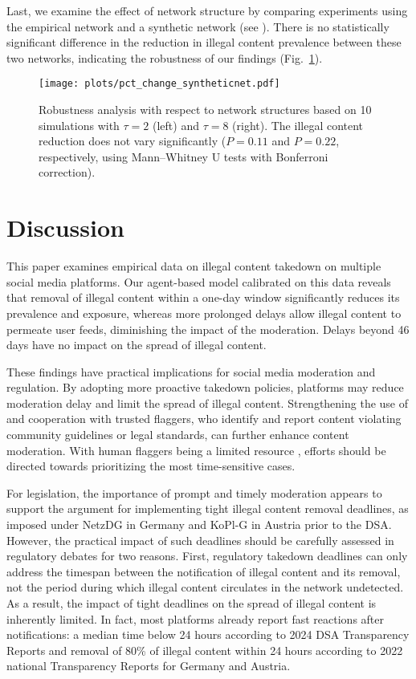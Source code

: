 \documentclass{article}
\begin{document}
Last, we examine the effect of network structure by comparing experiments using the empirical network and a synthetic network (see ). There is no statistically significant difference in the reduction in illegal content prevalence between these two networks, indicating the robustness of our findings (Fig.~\ref{fig:syntheticnet}).

\begin{figure}
\centering
\texttt{[image: plots/pct\_change\_syntheticnet.pdf]}
\caption{Robustness analysis with respect to network structures based on 10 simulations with $\tau=2$ (left) and $\tau=8$ (right). The illegal content reduction does not vary significantly ($P= 0.11$ and $P=0.22$, respectively, using Mann–Whitney U tests with Bonferroni correction).}
\label{fig:syntheticnet}
\end{figure}

\section*{Discussion}

This paper examines empirical data on illegal content takedown on multiple social media platforms. 
Our agent-based model calibrated on this data reveals that removal of illegal content within a one-day window significantly reduces its prevalence and exposure, whereas more prolonged delays allow illegal content to permeate user feeds, diminishing the impact of the moderation. Delays beyond 46 days have no impact on the spread of illegal content. 

These findings have practical implications for social media moderation and regulation. By adopting more proactive takedown policies, platforms may reduce moderation delay and limit the spread of illegal content. Strengthening the use of and cooperation with trusted flaggers, who identify and report content violating community guidelines or legal standards, can further enhance content moderation. With human flaggers being a limited resource \cite{fbdsa24oct}, efforts should be directed towards prioritizing the most time-sensitive cases.

For legislation, the importance of prompt and timely moderation appears to support the argument for implementing tight illegal content removal deadlines, as imposed under NetzDG in Germany and KoPl-G in Austria prior to the DSA. 
However, the practical impact of such deadlines should be carefully assessed in regulatory debates for two reasons. 
First, regulatory takedown deadlines can only address the timespan between the notification of illegal content and its removal, not the period during which illegal content circulates in the network undetected. As a result, the impact of tight deadlines on the spread of illegal content is inherently limited. In fact, most platforms already report fast reactions after notifications: a median time below 24 hours according to 2024 DSA Transparency Reports and removal of 80\% of illegal content within 24 hours 
according to 2022 national Transparency Reports for Germany and Austria.
\end{document}

